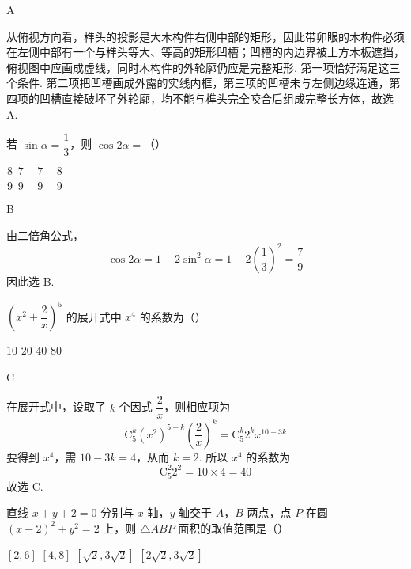 \begin{answer}
A
\end{answer}

\begin{solution}
从俯视方向看，榫头的投影是大木构件右侧中部的矩形，因此带卯眼的木构件必须在左侧中部有一个与榫头等大、等高的矩形凹槽；凹槽的内边界被上方木板遮挡，俯视图中应画成虚线，同时木构件的外轮廓仍应是完整矩形. 第一项恰好满足这三个条件. 第二项把凹槽画成外露的实线内框，第三项的凹槽未与左侧边缘连通，第四项的凹槽直接破坏了外轮廓，均不能与榫头完全咬合后组成完整长方体，故选 A.
\end{solution}

\begin{problem}
若 \(\sin\alpha=\dfrac13\)，则 \(\cos2\alpha=\)（\quad）

\choices
    {\(\dfrac89\)}
    {\(\dfrac79\)}
    {\(-\dfrac79\)}
    {\(-\dfrac89\)}
\end{problem}

\begin{answer}
B
\end{answer}

\begin{solution}
由二倍角公式，
\[
\cos 2\alpha=1-2\sin^2\alpha=1-2\left(\dfrac13\right)^2=\dfrac79
\]
因此选 B.
\end{solution}

\begin{problem}
\(\left(x^2+\dfrac{2}{x}\right)^5\) 的展开式中 \(x^4\) 的系数为（\quad）

\choices
    {\(10\)}
    {\(20\)}
    {\(40\)}
    {\(80\)}
\end{problem}

\begin{answer}
C
\end{answer}

\begin{solution}
在展开式中，设取了 \(k\) 个因式 \(\dfrac2x\)，则相应项为
\[
\mathrm C_5^k(x^2)^{5-k}\left(\dfrac2x\right)^k
=\mathrm C_5^k2^k x^{10-3k}
\]
要得到 \(x^4\)，需 \(10-3k=4\)，从而 \(k=2\). 所以 \(x^4\) 的系数为
\[
\mathrm C_5^2 2^2=10\times4=40
\]
故选 C.
\end{solution}

\begin{problem}
直线 \(x+y+2=0\) 分别与 \(x\) 轴，\(y\) 轴交于 \(A\)，\(B\) 两点，点 \(P\) 在圆 \((x-2)^2+y^2=2\) 上，则 \(\triangle ABP\) 面积的取值范围是（\quad）

\choices
    {\([2,6]\)}
    {\([4,8]\)}
    {\(\left[\sqrt2,3\sqrt2\right]\)}
    {\(\left[2\sqrt2,3\sqrt2\right]\)}
\end{problem}

